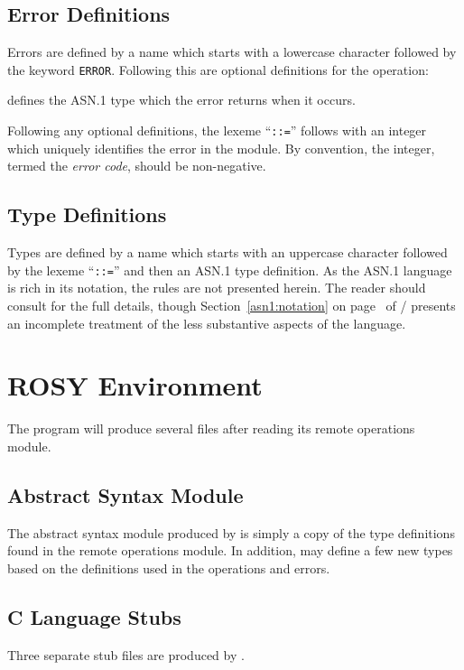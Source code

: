 \subsection	{Error Definitions}
Errors are defined by a name which starts with a lowercase character
followed by the keyword \verb"ERROR".
Following this are optional definitions for the operation:
\begin{describe}
\item[\verb"PARAMETER":]defines the ASN.1 type which the error returns
			when it occurs.
\end{describe}
Following any optional definitions,
the lexeme ``\verb"::="'' follows with an integer which uniquely identifies the
error in the module.
By convention, the integer,
termed the {\em error code},
should be non-negative.

\subsection	{Type Definitions}
Types are defined by a name which starts with an uppercase character
followed by the lexeme ``\verb"::="'' and then an ASN.1 type definition.
As the ASN.1 language is rich in its notation,
the rules are not presented herein.
The reader should consult \cite{ISO.PP.Syntax,CCITT.PP.Syntax} for the full
details,
though Section~\ref{asn1:notation} on page~\pageref{asn1:notation} of \volone/
presents an incomplete treatment of the less substantive aspects of the
language.

\newpage
{}
\newpage

\section	{ROSY Environment}
The  program will produce several files after reading its remote
operations module.

\subsection	{Abstract Syntax Module}
The abstract syntax module produced by  is simply a copy of the
type definitions found in the remote operations module.
In addition,
 may define a few new types based on the definitions used in the
operations and errors.

\subsection	{C Language Stubs}
Three separate stub files are produced by .

